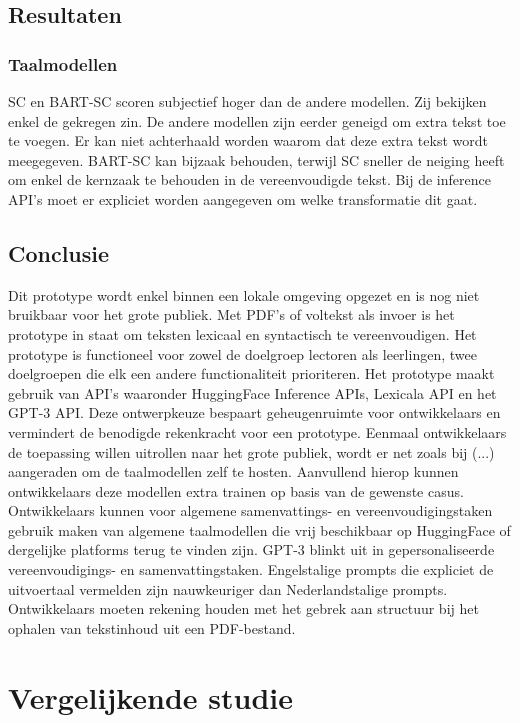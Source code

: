 \section{Resultaten}

\subsection{Taalmodellen}

SC en BART-SC scoren subjectief hoger dan de andere modellen. Zij bekijken enkel de gekregen zin. De andere modellen zijn eerder geneigd om extra tekst toe te voegen. Er kan niet achterhaald worden waarom dat deze extra tekst wordt meegegeven.
BART-SC kan bijzaak behouden, terwijl SC sneller de neiging heeft om enkel de kernzaak te behouden in de vereenvoudigde tekst. Bij de inference API's moet er expliciet worden aangegeven om welke  transformatie dit gaat. 

\section{Conclusie}

Dit prototype wordt enkel binnen een lokale omgeving opgezet en is nog niet bruikbaar voor het grote publiek. Met PDF's of voltekst als invoer is het prototype in staat om teksten lexicaal en syntactisch te vereenvoudigen. Het prototype is functioneel voor zowel de doelgroep lectoren als leerlingen, twee doelgroepen die elk een andere functionaliteit prioriteren. Het prototype maakt gebruik van API's waaronder HuggingFace Inference APIs, Lexicala API en het GPT-3 API. Deze ontwerpkeuze bespaart geheugenruimte voor ontwikkelaars en vermindert de benodigde rekenkracht voor een prototype. Eenmaal ontwikkelaars de toepassing willen uitrollen naar het grote publiek, wordt er net zoals bij (...) aangeraden om de taalmodellen zelf te hosten. Aanvullend hierop kunnen ontwikkelaars deze modellen extra trainen op basis van de gewenste casus. Ontwikkelaars kunnen voor algemene samenvattings- en vereenvoudigingstaken gebruik maken van algemene taalmodellen die vrij beschikbaar op HuggingFace of dergelijke platforms terug te vinden zijn. GPT-3 blinkt uit in gepersonaliseerde vereenvoudigings- en samenvattingstaken. Engelstalige prompts die expliciet de uitvoertaal vermelden zijn nauwkeuriger dan Nederlandstalige prompts. Ontwikkelaars moeten rekening houden met het gebrek aan structuur bij het ophalen van tekstinhoud uit een PDF-bestand.


\chapter{Vergelijkende studie}

